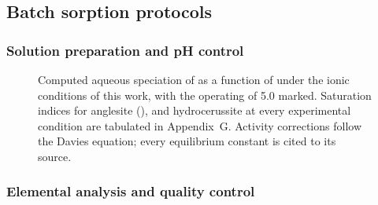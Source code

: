 \subsection{Batch sorption protocols}
\label{sec:batch-method}

\subsubsection{Solution preparation and pH control}
\label{sec:solution-prep}

\begin{figure}[htbp]
  \centering
  \caption[Computed \PbII{} speciation against \pH{}]{Computed aqueous speciation of \PbII{} as a function of \pH{} under the ionic conditions of this work, with the operating \pH{} of 5.0 marked. Saturation indices for anglesite (),  and hydrocerussite at every experimental condition are tabulated in Appendix~G. Activity corrections follow the Davies equation; every equilibrium constant is cited to its source.}
  \label{fig:speciation}
\end{figure}

\subsubsection{Elemental analysis and quality control}
\label{sec:aas-method}
%

